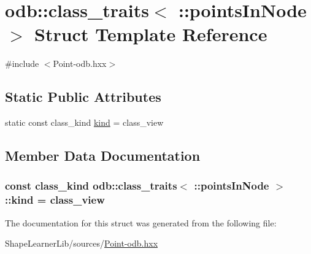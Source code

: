 \hypertarget{structodb_1_1class__traits_3_01_1_1points_in_node_01_4}{}\section{odb\+:\+:class\+\_\+traits$<$ \+:\+:points\+In\+Node $>$ Struct Template Reference}
\label{structodb_1_1class__traits_3_01_1_1points_in_node_01_4}


{\ttfamily \#include $<$Point-\/odb.\+hxx$>$}

\subsection*{Static Public Attributes}
\begin{DoxyCompactItemize}
\item 
static const class\+\_\+kind \hyperlink{structodb_1_1class__traits_3_01_1_1points_in_node_01_4_a61a346c9220a5417f2036a6ff3e472aa}{kind} = class\+\_\+view
\end{DoxyCompactItemize}


\subsection{Member Data Documentation}
\hypertarget{structodb_1_1class__traits_3_01_1_1points_in_node_01_4_a61a346c9220a5417f2036a6ff3e472aa}{}
\subsubsection[{kind}]{\setlength{\rightskip}{0pt plus 5cm}const class\+\_\+kind odb\+::class\+\_\+traits$<$ \+::{\bf points\+In\+Node} $>$\+::kind = class\+\_\+view\hspace{0.3cm}{\ttfamily [static]}}\label{structodb_1_1class__traits_3_01_1_1points_in_node_01_4_a61a346c9220a5417f2036a6ff3e472aa}


The documentation for this struct was generated from the following file\+:\begin{DoxyCompactItemize}
\item 
Shape\+Learner\+Lib/sources/\hyperlink{_point-odb_8hxx}{Point-\/odb.\+hxx}\end{DoxyCompactItemize}
